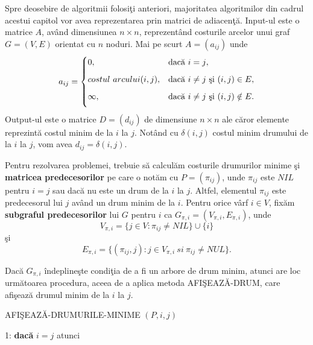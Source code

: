 \documentclass[11pt,a4paper]{report}
\begin{document}
     Spre deosebire de algoritmii folosi\c ti anteriori, majoritatea algoritmilor din cadrul acestui capitol vor avea reprezentarea prin matrici de adiacen\c t\u a. Input-ul este o matrice $A$, av\^ and dimensiunea $n\times n$, reprezent\^ and costurile arcelor unui graf $G=(V,E)$ orientat cu $n$ noduri. Mai pe scurt $A=(a_{ij})$ unde
     \begin{equation*}
     a_{ij}=
    \begin{cases}
     0,&\text{dac\u a $i=j$}, \medskip\\
     costul\ arcului(i,j),& \text{dac\u a $i\ne j$ \c si $(i,j)\in E$}, \medskip\\
     \infty,&\text{dac\u a $i\ne j$ \c si $(i,j)\notin E$}.\medskip
    \end{cases}
     \end{equation*}
     Output-ul este o matrice $D=(d_{ij})$ de dimensiune $n\times n$ ale c\u aror elemente reprezint\u a costul minim de la $i$ la $j$. Not\^ and cu $\delta(i,j)$  costul minim drumului de la $i$ la $j$, vom avea $d_{ij}=\delta(i,j)$.
     
     Pentru rezolvarea problemei, trebuie s\u a calcul\u am costurile drumurilor minime \c si \textbf{matricea predecesorilor} pe care o not\u am cu $P=(\pi_{ij})$, unde $\pi_{ij}$ este $NIL$ pentru $i=j$ sau dac\u a nu este un drum de la $i$ la $j$. Altfel, elementul $\pi_{ij}$ este predecesorul lui $j$ av\^ and un drum minim de la $i$. Pentru orice v\^arf $i\in V$, fix\u am \textbf{subgraful predecesorilor} lui $G$ pentru $i$ ca $G_{\pi,i}=(V_{\pi,i},E_{\pi,i})$, unde
     \begin{equation*}
     V_{\pi,i}=\{j\in V:\pi_{ij}\neq NIL\}\cup \{i\}
     \end{equation*}
     \c si 
     \begin{equation*}
     E_{\pi,i}=\{(\pi_{ij},j):j\in V_{\pi,i} \ si \ \pi_{ij}\neq NUL\}.
     \end{equation*}
     
     Dac\u a $G_{\pi,i} $ \^ indepline\c ste condi\c tia de a fi un arbore de drum minim, atunci are loc urm\u atoarea procedura, aceea de a aplica metoda AFI\c SEAZ\u A-DRUM, care afi\c seaz\u a drumul minim de la $i$ la $j$.
     
       \vspace{0.3cm}
     AFI\c SEAZ\u A-DRUMURILE-MINIME $(P,i,j)$
     
     \vspace{0.1cm}
     1: \textbf{dac\u a }$ i=j$ atunci 
     
\end{document}
